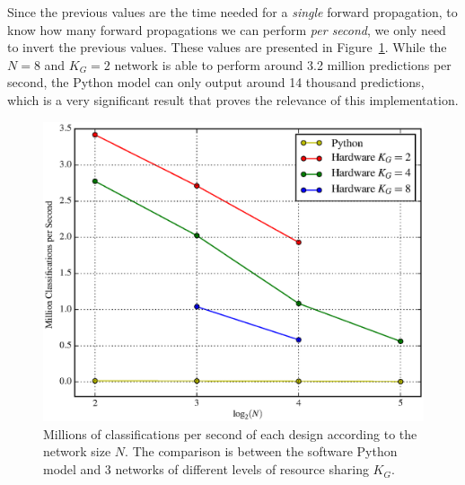  Since the previous values are the time needed for a \emph{single} forward propagation, to know how many forward propagations we can perform \emph{per second}, we only need to invert the previous values. These values are presented in Figure~\ref{fig:Mclass-psec}. While the $N=8$ and $K_G=2$ network is able to perform around 3.2 million predictions per second, the Python model can only output around 14 thousand predictions, which is a very significant result that proves the relevance of this implementation.
\begin{figure}
    \centering
    \includegraphics[width=\linewidth]{figures/Mclass-psec.eps}
    \caption[Millions of classifications per second of each design according to the network size $N$]{Millions of classifications per second of each design according to the network size $N$. The comparison is between the software Python model and 3 networks of different levels of resource sharing $K_G$.}
    \label{fig:Mclass-psec}
\end{figure}



